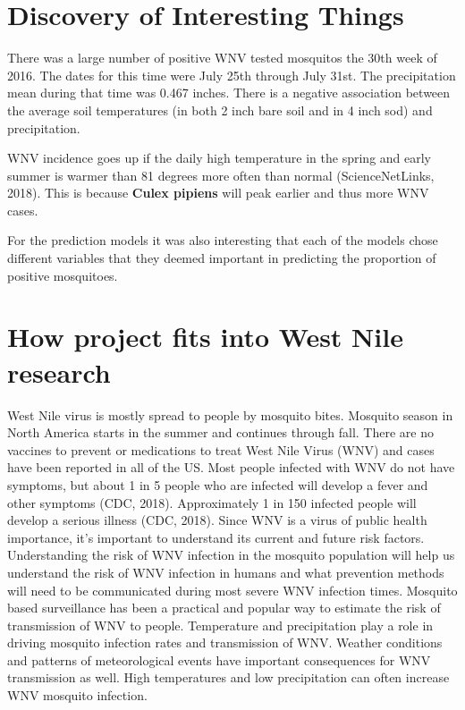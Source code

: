 \documentclass[]{article}
\begin{document}
\hypertarget{discovery-of-interesting-things}{%
\section{Discovery of Interesting
Things}\label{discovery-of-interesting-things}}

There was a large number of positive WNV tested mosquitos the 30th week
of 2016. The dates for this time were July 25th through July 31st. The
precipitation mean during that time was 0.467 inches. There is a
negative association between the average soil temperatures (in both 2
inch bare soil and in 4 inch sod) and precipitation.

WNV incidence goes up if the daily high temperature in the spring and
early summer is warmer than 81 degrees more often than normal
(ScienceNetLinks, 2018). This is because \textbf{Culex pipiens} will
peak earlier and thus more WNV cases.

For the prediction models it was also interesting that each of the
models chose different variables that they deemed important in
predicting the proportion of positive mosquitoes.

\hypertarget{how-project-fits-into-west-nile-research}{%
\section{How project fits into West Nile
research}\label{how-project-fits-into-west-nile-research}}

West Nile virus is mostly spread to people by mosquito bites. Mosquito
season in North America starts in the summer and continues through fall.
There are no vaccines to prevent or medications to treat West Nile Virus
(WNV) and cases have been reported in all of the US. Most people
infected with WNV do not have symptoms, but about 1 in 5 people who are
infected will develop a fever and other symptoms (CDC, 2018).
Approximately 1 in 150 infected people will develop a serious illness
(CDC, 2018). Since WNV is a virus of public health importance, it's
important to understand its current and future risk factors.
Understanding the risk of WNV infection in the mosquito population will
help us understand the risk of WNV infection in humans and what
prevention methods will need to be communicated during most severe WNV
infection times. Mosquito based surveillance has been a practical and
popular way to estimate the risk of transmission of WNV to people.
Temperature and precipitation play a role in driving mosquito infection
rates and transmission of WNV. Weather conditions and patterns of
meteorological events have important consequences for WNV transmission
as well. High temperatures and low precipitation can often increase WNV
mosquito infection.
\end{document}
